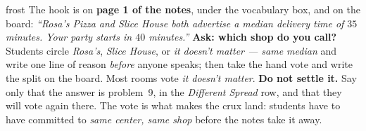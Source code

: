\documentclass[10pt]{article}
\begin{document}
\boxguard
\begin{skillbox}{frost}
The hook is on \textbf{page 1 of the notes}, under the vocabulary box, and on the board:
\textit{``Rosa's Pizza and Slice House both advertise a median delivery time of $35$
minutes. Your party starts in $40$ minutes.''} \textbf{Ask: which shop do you call?}
Students circle \emph{Rosa's}, \emph{Slice House}, or \emph{it doesn't matter --- same
median} and write one line of reason \emph{before} anyone speaks; then take the hand vote and
write the split on the board. Most rooms vote \emph{it doesn't matter}. \textbf{Do not settle
it.} Say only that the answer is problem~9, in the \emph{Different Spread} row, and that they
will vote again there. The vote is what makes the crux land: students have to have committed
to \emph{same center, same shop} before the notes take it away.
\end{skillbox}
\end{document}
